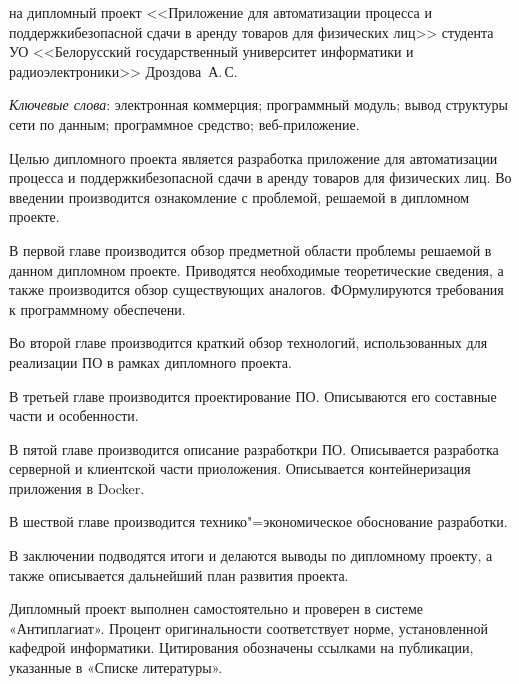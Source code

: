 \thispagestyle{empty}

\begin{center}
  \begin{minipage}{0.82\textwidth}
    на дипломный проект <<Приложение для автоматизации процесса и поддержкибезопасной сдачи в аренду товаров для физических лиц>> студента УО <<Белорусский государственный университет информатики и радиоэлектроники>> Дроздова~А.\,С.
  \end{minipage}
\end{center}

\emph{Ключевые слова}: электронная коммерция; программный модуль; вывод структуры сети по данным; программное средство; веб-приложение.

\vspace{4\parsep}


Целью дипломного проекта является разработка приложение для автоматизации процесса и поддержкибезопасной сдачи в аренду товаров для физических лиц.
Во введении производится ознакомление с проблемой, решаемой в дипломном проекте.

В первой главе производится обзор предметной области проблемы решаемой в данном дипломном проекте.
Приводятся необходимые теоретические сведения, а также производится обзор существующих аналогов.
ФОрмулируются требования к программному обеспечени.

Во второй главе производится краткий обзор технологий, использованных для реализации ПО в рамках дипломного проекта.

В третьей главе производится проектирование ПО.
Описываются его составные части и особенности.

В пятой главе производится описание разработкри ПО.
Описывается разработка серверной и клиентской части приоложения.
Описывается контейнеризация приложения в Docker.

В шествой главе производится технико"=экономическое обоснование разработки.

В заключении подводятся итоги и делаются выводы по дипломному проекту, а также описывается дальнейший план развития проекта.

Дипломный проект выполнен самостоятельно и проверен в системе «Антиплагиат».
Процент оригинальности соответствует норме, установленной кафедрой информатики.
Цитирования обозначены ссылками на публикации, указанные в «Списке литературы».


\clearpage
